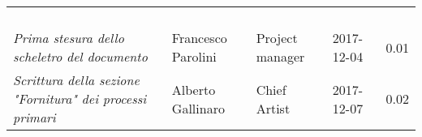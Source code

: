 \newpage 
\section*{}
\begin{table}[H]
	\centering
	\begin{tabular}{p{4cm}|C{3cm}|C{3cm}|R{2.5cm}|R{2cm}}
		
		 & & & & \\
		
		
		\emph{}	 & & & & \\
		\hline
		
		& & & & \\
		\hline
		
		& & & & \\
		\hline
		
		\emph{Prima stesura dello scheletro del documento} & Francesco Parolini & Project manager & 2017-12-04 & 0.01 \\
		
		\emph{Scrittura della sezione "Fornitura" dei processi primari} & Alberto Gallinaro & Chief Artist & 2017-12-07 & 0.02 \\
		
	\end{tabular}
	
\end{table}


\clearpage